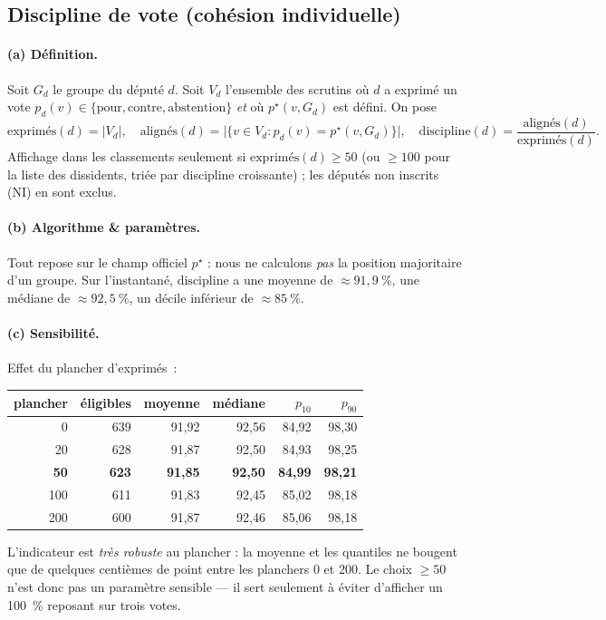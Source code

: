 \documentclass[11pt,a4paper]{article}
\begin{document}
\subsection{Discipline de vote (cohésion individuelle)}\label{sec:discipline}

\paragraph{(a) Définition.} Soit $G_d$ le groupe du député $d$. Soit $V_d$
l'ensemble des scrutins où $d$ a exprimé un vote $p_d(v)\in\{\text{pour},\text{contre},\text{abstention}\}$
\emph{et} où $p^\star(v,G_d)$ est défini. On pose
\[
\text{exprimés}(d)=|V_d|,\quad
\text{alignés}(d)=\big|\{v\in V_d : p_d(v)=p^\star(v,G_d)\}\big|,\quad
\mathrm{discipline}(d)=\frac{\text{alignés}(d)}{\text{exprimés}(d)}.
\]
Affichage dans les classements seulement si $\text{exprimés}(d)\ge 50$
(ou $\ge 100$ pour la liste des \og{}dissidents\fg{}, triée par discipline
croissante) ; les députés non inscrits (NI) en sont exclus.

\paragraph{(b) Algorithme \& paramètres.} Tout repose sur le champ officiel
$p^\star$ : nous ne calculons \emph{pas} la position majoritaire d'un groupe.
Sur l'instantané, $\mathrm{discipline}$ a une moyenne de $\approx 91{,}9~\%$, une
médiane de $\approx 92{,}5~\%$, un décile inférieur de $\approx 85~\%$.

\paragraph{(c) Sensibilité.} Effet du plancher d'exprimés~:
\begin{center}\small
\begin{tabular}{rrrrrr}
\toprule
plancher & éligibles & moyenne & médiane & $p_{10}$ & $p_{90}$ \\
\midrule
0   & 639 & 91,92 & 92,56 & 84,92 & 98,30 \\
20  & 628 & 91,87 & 92,50 & 84,93 & 98,25 \\
\textbf{50}  & \textbf{623} & \textbf{91,85} & \textbf{92,50} & \textbf{84,99} & \textbf{98,21} \\
100 & 611 & 91,83 & 92,45 & 85,02 & 98,18 \\
200 & 600 & 91,87 & 92,46 & 85,06 & 98,18 \\
\bottomrule
\end{tabular}
\end{center}
L'indicateur est \emph{très robuste} au plancher : la moyenne et les quantiles ne
bougent que de quelques centièmes de point entre les planchers $0$ et $200$. Le
choix $\ge 50$ n'est donc pas un paramètre sensible — il sert seulement à éviter
d'afficher un \og{}100~\%\fg{} reposant sur trois votes.
\end{document}
